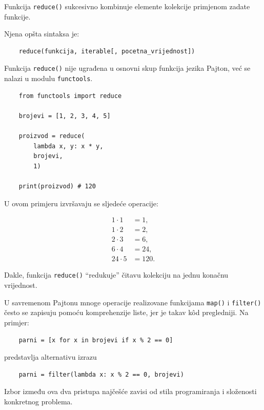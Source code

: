 Funkcija \texttt{reduce()} sukcesivno kombinuje elemente kolekcije primjenom zadate funkcije.

Njena opšta sintaksa je:
\begin{verbatim}
	reduce(funkcija, iterable[, pocetna_vrijednost])
\end{verbatim}

Funkcija \texttt{reduce()} nije ugrađena u osnovni skup funkcija jezika Pajton, već se nalazi u modulu \texttt{functools}.

\begin{verbatim}
	from functools import reduce
	
	brojevi = [1, 2, 3, 4, 5]
	
	proizvod = reduce(
	    lambda x, y: x * y,
	    brojevi,
	    1)
	
	print(proizvod) # 120
\end{verbatim}

U ovom primjeru izvršavaju se sljedeće operacije:

\begin{align*}
	1 \cdot 1 &= 1,\\
	1 \cdot 2 &= 2,\\
	2 \cdot 3 &= 6,\\
	6 \cdot 4 &= 24,\\
	24 \cdot 5 &= 120.
\end{align*}

Dakle, funkcija \texttt{reduce()} ``redukuje'' čitavu kolekciju na jednu konačnu vrijednost.


U savremenom Pajtonu mnoge operacije realizovane funkcijama \texttt{map()} i \texttt{filter()} često se zapisuju pomoću komprehenzije liste, jer je takav k\^od pregledniji. Na primjer:

\begin{verbatim}
	parni = [x for x in brojevi if x % 2 == 0]
\end{verbatim}

predstavlja alternativu izrazu

\begin{verbatim}
	parni = filter(lambda x: x % 2 == 0, brojevi)
\end{verbatim}

Izbor između ova dva pristupa najčešće zavisi od stila programiranja i složenosti konkretnog problema.


